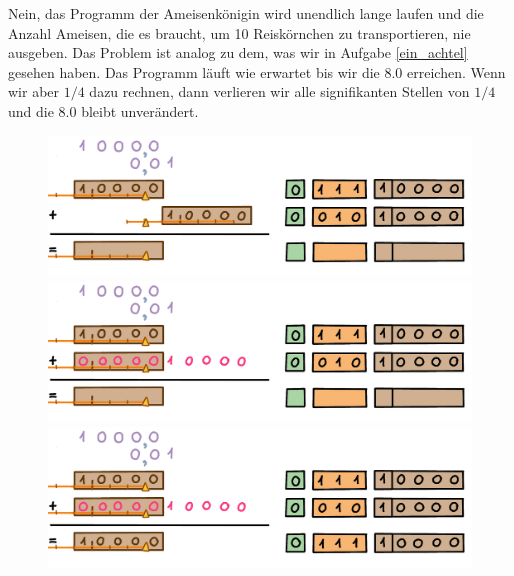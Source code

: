 Nein, das Programm der Ameisenkönigin wird unendlich lange laufen und die Anzahl Ameisen, die es braucht, um 10 Reiskörnchen zu transportieren, nie ausgeben. Das Problem ist analog zu dem, was wir in Aufgabe \ref{ein_achtel} gesehen haben. Das Programm läuft wie erwartet bis wir die \(8.0\) erreichen. Wenn wir aber \(1/4\) dazu rechnen, dann verlieren wir alle signifikanten Stellen von \(1/4\) und die \(8.0\) bleibt unverändert.
\begin{figure}[H]
\centering
\includegraphics[width=\linewidth]{Pictures/Addition8and1-4_1.png} 
\includegraphics[width=\linewidth]{Pictures/Addition8and1-4_2.png} 
\includegraphics[width=\linewidth]{Pictures/Addition8and1-4_3.png} 
\end{figure}